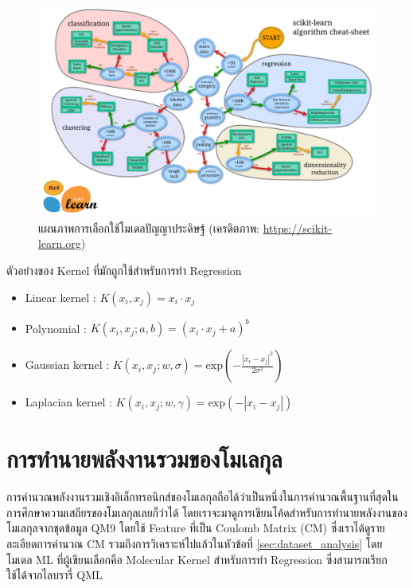 \begin{figure}[H]
    \centering
    \includegraphics[width=1.3\linewidth,angle=90]{fig/ml_map.png}
    \caption{แผนภาพการเลือกใช้โมเดลปัญญาประดิษฐ์ (เครดิตภาพ: \url{https://scikit-learn.org})}
    \label{fig:ml_map}
\end{figure}

ตัวอย่างของ Kernel ที่มักถูกใช้สำหรับการทำ Regression

\begin{itemize}
    \item Linear kernel : $K(x_i, x_j) = x_i \cdot x_j$
    
    \item Polynomial : $K(x_i, x_j; a, b) = (x_i \cdot x_j + a)^b$
    
    \item Gaussian kernel : $K(x_i, x_j; w, \sigma) = \mathrm{exp}\left(-\frac{|x_i-x_j|^2}{2\sigma^2}\right)$
    
    \item Laplacian kernel : $K(x_i, x_j; w, \gamma) = \mathrm{exp}\left(-{|x_i-x_j|}\right)$
\end{itemize}

\section{การทำนายพลังงานรวมของโมเลกุล}
\label{sec:pred_tot_ener}

การคำนวณพลังงานรวมเชิงอิเล็กทรอนิกส์ของโมเลกุลถือได้ว่าเป็นหนึ่งในการคำนวณพื้นฐานที่สุดในการศึกษาความเสถียรของโมเลกุลเลยก็ว่าได้
โดยเราจะมาดูการเขียนโค้ดสำหรับการทำนายพลังงานของโมเลกุลจากชุดข้อมูล QM9 โดยใช้ Feature ที่เป็น Coulomb Matrix (CM) 
ซึ่งเราได้ดูรายละเอียดการคำนวณ CM รวมถึงการวิเคราะห์ไปแล้วในหัวข้อที่ \ref{sec:dataset_analysis} โดยโมเดล ML ที่ผู้เขียนเลือกคือ
Molecular Kernel สำหรับการทำ Regression ซึ่งสามารถเรียกใช้ได้จากไลบรารี่ QML

